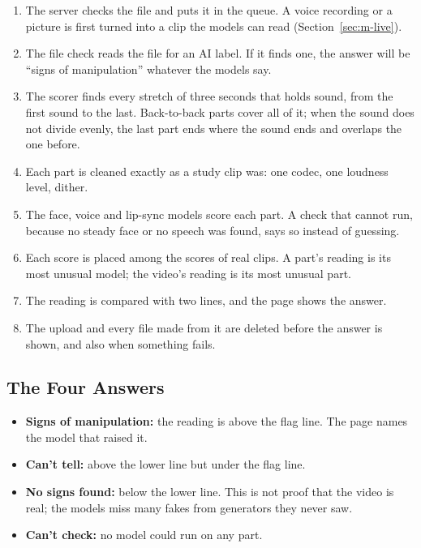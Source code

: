 \begin{enumerate}
    \item The server checks the file and puts it in the queue. A voice
    recording or a picture is first turned into a clip the models can read
    (Section~\ref{sec:m-live}).
    \item The file check reads the file for an AI label. If it finds one, the
    answer will be ``signs of manipulation'' whatever the models say.
    \item The scorer finds every stretch of three seconds that holds sound,
    from the first sound to the last. Back-to-back parts cover all of it; when
    the sound does not divide evenly, the last part ends where the sound ends
    and overlaps the one before.
    \item Each part is cleaned exactly as a study clip was: one codec, one
    loudness level, dither.
    \item The face, voice and lip-sync models score each part. A check that
    cannot run, because no steady face or no speech was found, says so instead
    of guessing.
    \item Each score is placed among the scores of real clips. A part's
    reading is its most unusual model; the video's reading is its most unusual
    part.
    \item The reading is compared with two lines, and the page shows the
    answer.
    \item The upload and every file made from it are deleted before the answer
    is shown, and also when something fails.
\end{enumerate}

\subsection{The Four Answers}

\begin{itemize}
    \item \textbf{Signs of manipulation:} the reading is above the flag line.
    The page names the model that raised it.
    \item \textbf{Can't tell:} above the lower line but under the flag line.
    \item \textbf{No signs found:} below the lower line. This is not proof that
    the video is real; the models miss many fakes from generators they never
    saw.
    \item \textbf{Can't check:} no model could run on any part.
\end{itemize}

